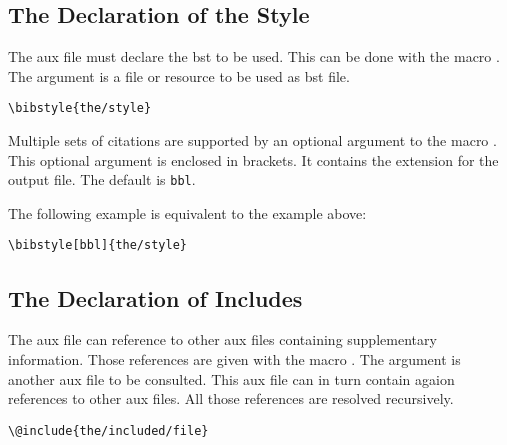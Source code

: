 \subsection{The Declaration of the Style}

The aux file must declare the bst to be used. This can be done with
the macro . The argument is a file or resource to be
used as bst file.

\begin{lstlisting}[language={[LaTeX]TeX}]
  \bibstyle{the/style}
\end{lstlisting}

Multiple sets of citations are supported by an optional argument to
the macro . This optional argument is enclosed in
brackets. It contains the extension for the output file. The default
is \texttt{bbl}.

The following example is equivalent to the example above:

\begin{lstlisting}[language={[LaTeX]TeX}]
  \bibstyle[bbl]{the/style}
\end{lstlisting}

\subsection{The Declaration of Includes}

The aux file can reference to other aux files containing supplementary
information. Those references are given  with the macro
. The argument is another aux file to be consulted.
This aux file can in turn contain agaion references to other aux
files. All those references are resolved recursively.

\begin{lstlisting}[language={[LaTeX]TeX},%
  alsoletter={@},morekeywords={@include}]
  \@include{the/included/file}
\end{lstlisting}


\endinput
%
